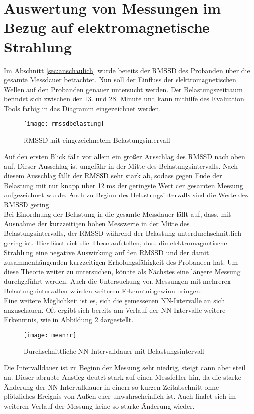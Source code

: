 \section{Auswertung von Messungen im Bezug auf elektromagnetische Strahlung}
Im Abschnitt \ref{sec:anschaulich} wurde bereits der \acs{RMSSD} des Probanden über die gesamte Messdauer betrachtet. Nun soll der Einfluss der elektromagnetischen Wellen auf den Probanden genauer untersucht werden. Der Belastungszeitraum befindet sich zwischen der 13. und 28. Minute und kann mithilfe des Evaluation Tools farbig in das Diagramm eingezeichnet werden.
\begin{figure}[H]
	\centering
	\texttt{[image: rmssdbelastung]}
	\caption{RMSSD mit eingezeichnetem Belastungsintervall}
	\label{fig:rmssdbelastung}
\end{figure}
Auf den ersten Blick fällt vor allem ein großer Ausschlag des \acs{RMSSD} nach oben auf. Dieser Ausschlag ist ungefähr in der Mitte des Belastungsintervalls. Nach diesem Ausschlag fällt der \acs{RMSSD} sehr stark ab, sodass gegen Ende der Belastung mit nur knapp über 12 ms der geringste Wert der gesamten Messung aufgezeichnet wurde. Auch zu Beginn des Belastungsintervalls sind die Werte des \acs{RMSSD} gering. \\
Bei Einordnung der Belastung in die gesamte Messdauer fällt auf, dass, mit Ausnahme der kurzzeitigen hohen Messwerte in der Mitte des Belastungsintervalls, der \acs{RMSSD} während der Belastung unterdurchschnittlich gering ist. Hier lässt sich die These aufstellen, dass die elektromagnetische Strahlung eine negative Auswirkung auf den \acs{RMSSD} und der damit zusammenhängenden kurzzeitigen Erholungsfähigkeit des Probanden hat. Um diese Theorie weiter zu untersuchen, könnte als Nächstes eine längere Messung durchgeführt werden. Auch die Untersuchung von Messungen mit mehreren Belastungsintervallen würden weiteren Erkenntnisgewinn bringen. \\
Eine weitere Möglichkeit ist es, sich die gemessenen NN-Intervalle an sich anzuschauen. Oft ergibt sich bereits am Verlauf der NN-Intervalle weitere Erkenntnis, wie in Abbildung \ref{fig:meanrr} dargestellt.
\begin{figure}[H]
	\centering
	\texttt{[image: meanrr]}
	\caption{Durchschnittliche NN-Intervalldauer mit Belastungsintervall }
	\label{fig:meanrr}
\end{figure}

Die Intervalldauer ist zu Beginn der Messung sehr niedrig, steigt dann aber steil an. Dieser abrupte Anstieg deutet stark auf einen Messfehler hin, da die starke Änderung der NN-Intervalldauer in einem so kurzen Zeitabschnitt ohne plötzliches Ereignis von Außen eher unwahrscheinlich ist. Auch findet sich im weiteren Verlauf der Messung keine so starke Änderung wieder.\\

